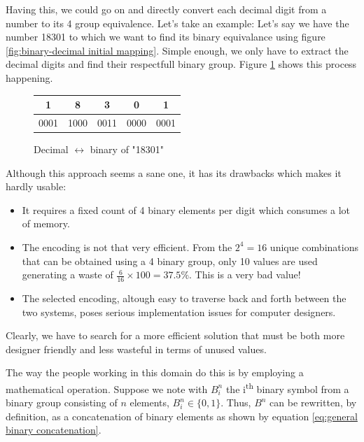 \documentclass[12pt, a4paper]{book}
\begin{document}
Having this, we could go on and directly convert each decimal digit from a number to its 4 group equivalence. Let's take an example: Let's say we have  the number 18301 to which we want to find its binary equivalance using figure \ref{fig:binary-decimal initial mapping}. Simple enough, we only have to extract the decimal digits and find their respectfull binary group. Figure \ref{fig:binary-decimal 18301 example} shows this process happening.

\begin{figure}[h]
  \centering
  \renewcommand{\arraystretch}{1.5}
  \begin{tabular}{c c c c c}
    {\Large 1} & {\Large 8} & {\Large 3} & {\Large 0} & {\Large 1} \\ \hline
    {\large 0001} & {\large 1000} & {\large 0011} & {\large 0000} & {\large 0001} \\
  \end{tabular}
  \renewcommand{\arraystretch}{1.0}
  \caption{Decimal $\leftrightarrow$ binary of "18301"}
  \label{fig:binary-decimal 18301 example}
\end{figure}

Although this approach seems a sane one, it has its drawbacks which makes it hardly usable:

\begin{itemize}
  \item It requires a fixed count of 4 binary elements per digit which consumes a lot of memory.
  \item The encoding is not that very efficient. From the $2^4=16$ unique combinations that can be obtained using a 4 binary group, only 10 values are used generating a waste of $\frac{6}{16} \times 100 = 37.5\%$. This is a very bad value!
  \item The selected encoding, altough easy to traverse back and forth between the two systems, poses serious implementation issues for computer designers.
\end{itemize}

Clearly, we have to search for a more efficient solution that must be both more designer friendly and less wasteful in terms of unused values.

The way the people working in this domain do this is by employing a mathematical operation. Suppose we note with $B^n_i$ the i\textsuperscript{th} binary symbol from a binary group consisting of $n$ elements, $B^n_i \in \{0, 1\}$. Thus, $B^n$ can be rewritten, by definition, as a concatenation of binary elements as shown by equation \ref{eq:general binary concatenation}.
\end{document}
